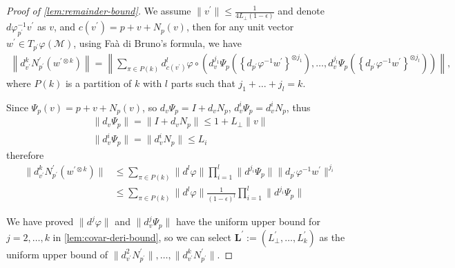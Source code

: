 \begin{proof}[Proof of \cref{lem:remainder-bound}]
We assume $\|v^\prime\| \leq \frac{1}{4L_\perp(1-\epsilon)}$ and denote $d\varphi_{p^\prime}^{-1}v^\prime$ as $v$, and $c(v^\prime)=p+v+N_p(v)$, then for any unit vector $w^\prime \in T_{p^\prime} \varphi(\mathcal{M})$, using Faà di Bruno's formula, we have
\begin{align}
	\left\|d^k_{v^\prime}N^\prime_{p^\prime}(w^{\prime \otimes k})\right\| \!= \! \left\| \sum\limits_{\pi \in P(k)} \! d^l_{c(v^\prime)} \varphi \circ \! \left(d^{j_1}_v \Psi_p \! \left(\left\{d_{p^\prime}\varphi^{-1} w^\prime\right\}^{\otimes j_{1}}\right),\dots,d^{j_l}_v \Psi_p \! \left(\left\{d_{p^\prime}\varphi^{-1} w^\prime\right\}^{\otimes j_{l}}\right) \right)\right\|,
\end{align}
where $P(k)$ is a partition of $k$ with $l$ parts such that $j_1+\dots+j_l=k$.


Since $\Psi_p(v)=p+v+N_p(v)$, so $d_v \Psi_p = I+ d_v N_p$, $d^i_v \Psi_p = d^i_v N_p$, thus
\begin{align}
	\|d_v \Psi_p\| = \| I+ d_v N_p \| \leq 1 + L_\perp \|v\| \\
	\|d^i_v \Psi_p\| =\|d^i_v N_p\| \leq L_i
\end{align}
therefore
\begin{align}
\|d^k_{v^\prime}N^\prime_{p^\prime}(w^{\prime \otimes k})\| &\leq \sum\limits_{\pi \in P(k)} \|d^l \varphi\| \prod_{i=1}^l \| d^{j_i} \Psi_p\| \|d_{p^\prime}\varphi^{-1} w^\prime\|^{j_i} \\
&\leq \sum\limits_{\pi \in P(k)} \|d^l \varphi\| \frac{1}{(1-\epsilon)^l} \prod_{i=1}^l \| d^{j_i} \Psi_p\| 
\end{align}


We have proved $\|d^j \varphi\|$ and $\|d^j_v \Psi_p\|$ have the uniform upper bound for $j=2,\dots,k$ in \cref{lem:covar-deri-bound}, so we can select $\textbf{L}^\prime:=\left(L_\perp^\prime,\dots,L_k^\prime\right)$ as the uniform upper bound of $\|d^2_{v^\prime}N^\prime_{p^\prime}\|,\dots,\|d^k_{v^\prime}N^\prime_{p^\prime}\|$.
\end{proof}